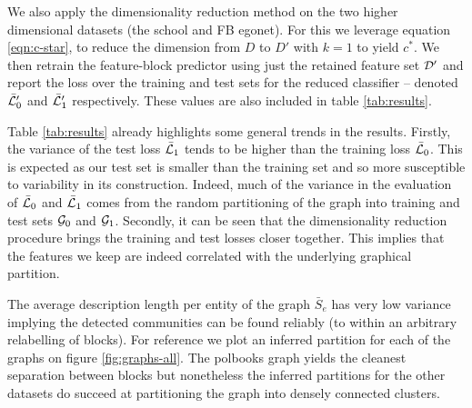 We also apply the dimensionality reduction method on the two higher dimensional datasets (the school and FB egonet). For this we leverage equation \ref{eqn:c-star}, to reduce the dimension from $D$ to $D'$ with $k=1$ to yield $c^*$. We then retrain the feature-block predictor using just the retained feature set $\mathcal{D}'$ and report the loss over the training and test sets for the reduced classifier -- denoted $\bar{\mathcal{L}}_0'$ and $\bar{\mathcal{L}}_1'$ respectively. These values are also included in table \ref{tab:results}.

\begin{table}[!h]
	\centering
	\caption{Experimental results averaged over $n=10$ iterations (mean $\pm$ standard deviation)}
	\label{tab:results}
\end{table}

Table \ref{tab:results} already highlights some general trends in the results. Firstly, the variance of the test loss $\bar{\mathcal{L}}_1$ tends to be higher than the training loss $\bar{\mathcal{L}}_0$. This is expected as our test set is smaller than the training set and so more susceptible to variability in its construction. Indeed, much of the variance in the evaluation of $\bar{\mathcal{L}}_0$ and $\bar{\mathcal{L}}_1$ comes from the random partitioning of the graph into training and test sets $\mathcal{G}_0$ and $\mathcal{G}_1$. Secondly, it can be seen that the dimensionality reduction procedure brings the training and test losses closer together. This implies that the features we keep are indeed correlated with the underlying graphical partition.

The average description length per entity of the graph $\bar{S}_e$ has very low variance implying the detected communities can be found reliably (to within an arbitrary relabelling of blocks). For reference we plot an inferred partition for each of the graphs on figure \ref{fig:graphs-all}. The polbooks graph yields the cleanest separation between blocks but nonetheless the inferred partitions for the other datasets do succeed at partitioning the graph into densely connected clusters.

